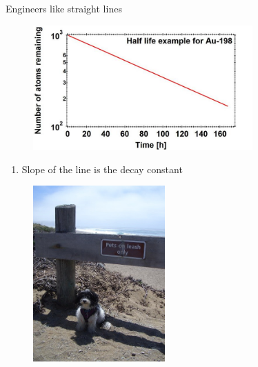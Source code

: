 \documentclass[aspectratio=1610,pdftex,dvipsnames,compress,xcolor={dvipsnames}]{beamer}
\begin{document}
\begin{frame}{Engineers like straight lines}
    \begin{figure}
        \centering
        \includegraphics[width=0.75\textwidth]{au198.log.jpg}
    \end{figure}

    \vspace*{\fill}

    \begin{enumerate}[series=outerlist,topsep=0pt,itemsep=21pt,leftmargin=*,label=(\arabic*)]
        \item[]Slope of the line is the decay constant
    \end{enumerate}
\end{frame}


\begin{frame}[plain]{}
    \begin{figure}
        \centering
        \includegraphics[width=0.45\textwidth]{final.jpg}
    \end{figure}
\end{frame}
\end{document}
